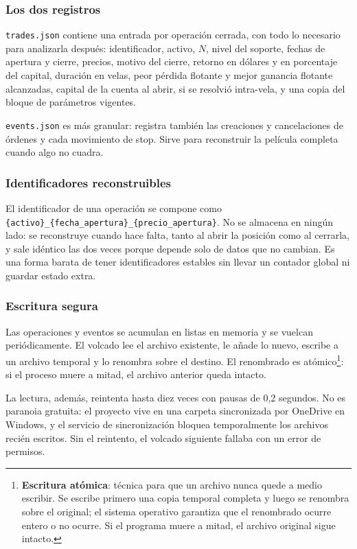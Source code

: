 \documentclass[11pt,a4paper]{article}
\newcommand{\code}[1]{\texttt{\small #1}}
\newcommand{\bigsep}{\par\vspace{3pt}}
\begin{document}
\subsubsection{Los dos registros}

\code{trades.json} contiene una entrada por operación cerrada, con todo lo necesario para
analizarla después: identificador, activo, $N$, nivel del soporte, fechas de apertura y
cierre, precios, motivo del cierre, retorno en dólares y en porcentaje del capital,
duración en velas, peor pérdida flotante y mejor ganancia flotante alcanzadas, capital de la
cuenta al abrir, si se resolvió intra-vela, y una copia del bloque de parámetros vigentes.

\bigsep
\code{events.json} es más granular: registra también las creaciones y cancelaciones de
órdenes y cada movimiento de stop. Sirve para reconstruir la película completa cuando algo
no cuadra.

\subsubsection{Identificadores reconstruibles}

El identificador de una operación se compone como
\code{\{activo\}_\{fecha_apertura\}_\{precio_apertura\}}. No se almacena en ningún lado: se
reconstruye cuando hace falta, tanto al abrir la posición como al cerrarla, y sale idéntico
las dos veces porque depende solo de datos que no cambian. Es una forma barata de tener
identificadores estables sin llevar un contador global ni guardar estado extra.

\subsubsection{Escritura segura}

Las operaciones y eventos se acumulan en listas en memoria y se vuelcan periódicamente. El
volcado lee el archivo existente, le añade lo nuevo, escribe a un archivo temporal y lo
renombra sobre el destino. El renombrado es atómico\footnote{\textbf{Escritura atómica}:
técnica para que un archivo nunca quede a medio escribir. Se escribe primero una copia
temporal completa y luego se renombra sobre el original; el sistema operativo garantiza que
el renombrado ocurre entero o no ocurre. Si el programa muere a mitad, el archivo original
sigue intacto.}: si el proceso muere a mitad, el archivo anterior queda intacto.

\bigsep
La lectura, además, reintenta hasta diez veces con pausas de 0,2 segundos. No es paranoia
gratuita: el proyecto vive en una carpeta sincronizada por OneDrive en Windows, y el
servicio de sincronización bloquea temporalmente los archivos recién escritos. Sin el
reintento, el volcado siguiente fallaba con un error de permisos.
\end{document}
